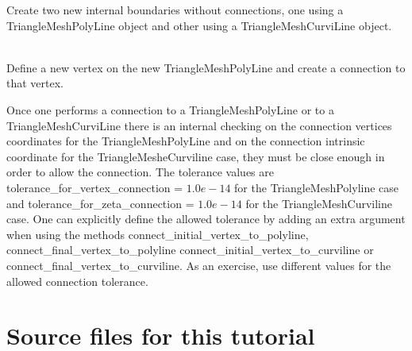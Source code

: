 \begin{DoxyEnumerate}
\item Create two new internal boundaries without connections, one using a {\ttfamily Triangle\+Mesh\+Poly\+Line} object and other using a {\ttfamily Triangle\+Mesh\+Curvi\+Line} object. ~\newline
~\newline

\item Define a new vertex on the new {\ttfamily Triangle\+Mesh\+Poly\+Line} and create a connection to that vertex. ~\newline
~\newline

\item Once one performs a connection to a {\ttfamily Triangle\+Mesh\+Poly\+Line} or to a {\ttfamily Triangle\+Mesh\+Curvi\+Line} there is an internal checking on the connection vertices coordinates for the {\ttfamily Triangle\+Mesh\+Poly\+Line} and on the connection intrinsic coordinate for the {\ttfamily Triangle\+Meshe\+Curviline} case, they must be close enough in order to allow the connection. The tolerance values are {\ttfamily tolerance\+\_\+for\+\_\+vertex\+\_\+connection} = $ 1.0e-14 $ for the {\ttfamily Triangle\+Mesh\+Polyline} case and {\ttfamily tolerance\+\_\+for\+\_\+zeta\+\_\+connection} = $ 1.0e-14 $ for the {\ttfamily Triangle\+Mesh\+Curviline} case. One can explicitly define the allowed tolerance by adding an extra argument when using the methods {\ttfamily connect\+\_\+initial\+\_\+vertex\+\_\+to\+\_\+polyline}, {\ttfamily connect\+\_\+final\+\_\+vertex\+\_\+to\+\_\+polyline} {\ttfamily connect\+\_\+initial\+\_\+vertex\+\_\+to\+\_\+curviline} or {\ttfamily connect\+\_\+final\+\_\+vertex\+\_\+to\+\_\+curviline}. As an exercise, use different values for the allowed connection tolerance.
\end{DoxyEnumerate}



 

\hypertarget{index_sources}{}\section{Source files for this tutorial}\label{index_sources}

